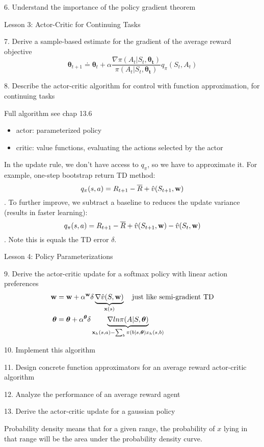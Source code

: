 \documentclass[sutton_barto_notes.tex]{subfiles}
\begin{document}
6. Understand the importance of the policy gradient theorem 

Lesson 3: Actor-Critic for Continuing Tasks 

7. Derive a sample-based estimate for the gradient of the average reward objective 
$$\bm{\theta}_{t+1} \doteq \bm{\theta}_t + \alpha \frac{\nabla \pi(A_t | S_t, \bm{\theta_t})}{\pi(A_t | S_t, \bm{\theta_t})}q_\pi(S_t,A_t)$$

8. Describe the actor-critic algorithm for control with function approximation, for continuing tasks 

Full algorithm see chap 13.6

\begin{itemize}
\item actor: parameterized policy
\item critic: value functions, evaluating the actions selected by the actor
\end{itemize}
In the update rule, we don't have access to $q_\pi$, so we have to approximate it. For example, one-step bootstrap return TD method:
$$q_\pi(s,a) = R_{t+1} - \overline{R}+\hat{v}(S_{t+1}, {\operatorname*{\mathbf{w}}}) $$.
To further improve, we subtract a baseline to reduces the update variance (results in faster learning):
$$q_\pi(s,a) = R_{t+1} - \overline{R}+\hat{v}(S_{t+1}, {\operatorname*{\mathbf{w}}}) - \hat{v}(S_t, {\operatorname*{\mathbf{w}}}) $$.
Note this is equals the TD error $\delta$.

Lesson 4: Policy Parameterizations 

9. Derive the actor-critic update for a softmax policy with linear action preferences 
\begin{align*}
{\operatorname*{\mathbf{w}}} &= {\operatorname*{\mathbf{w}}} + \alpha^{{\operatorname*{\mathbf{w}}}} \delta \underbrace{\nabla\hat{v}(S,{\operatorname*{\mathbf{w}}})}_{{\operatorname*{\mathbf{x}}}(s)} \quad \text{just like semi-gradient TD}\\
\bm{\theta} &= \bm{\theta} + \alpha^{\bm{\theta}}\delta \underbrace{\nabla ln \pi(A|S,\bm{\theta})}_{ {\operatorname*{\mathbf{x}}}_h(s,a) - \sum_b \pi(b|s, \bm{\theta})x_h(s,b) }
\end{align*}

10. Implement this algorithm 

11. Design concrete function approximators for an average reward actor-critic algorithm 

12. Analyze the performance of an average reward agent 

13. Derive the actor-critic update for a gaussian policy 

Probability density means that for a given range, the probability of $x$ lying in that range will be the area under the probability density curve.
\end{document}
